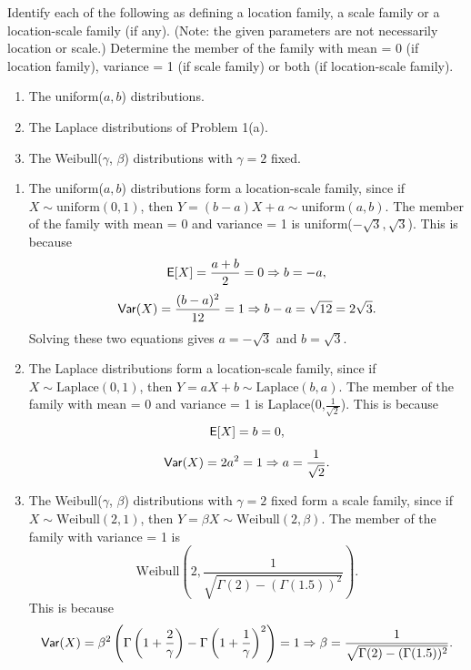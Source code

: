 \documentclass[12pt]{article}
\newcommand{\E}{{\sf E}}
\newcommand{\Var}{{\sf Var}}
\newenvironment{problem}[2][Problem]{\begin{trivlist}
\item[\hskip \labelsep {\bfseries #1}\hskip \labelsep {\bfseries #2.}]}
{\end{trivlist}}
\begin{document}
\begin{problem}{4}
  Identify each of the following as defining a location family, 
  a scale family or a location-scale family (if any). 
  (Note: the given parameters are not necessarily location or scale.) 
  Determine the member of the family with mean = 0 (if location family), 
  variance = 1 (if scale family) or both (if location-scale family).
  \begin{enumerate}
    \item The uniform($a, b$) distributions.
    \item The Laplace distributions of Problem 1(a).
    \item The Weibull($\gamma$, $\beta$) distributions with $\gamma = 2$
    fixed.
  \end{enumerate}
  
  \begin{enumerate}
    \item The uniform($a, b$) distributions form a location-scale family,
    since if $X \sim \text{uniform}(0,1)$, then $Y = (b-a)X + a \sim
    \text{uniform}(a,b)$. The member of the family with mean = 0 and
    variance = 1 is uniform($-\sqrt{3}, \sqrt{3}$).
    This is because
    \[
      \E[X] = \frac{a + b}{2} = 0 \Rightarrow b = -a,
    \]
    \[
      \Var(X) = \frac{(b - a)^2}{12} = 1 \Rightarrow b - a = \sqrt{12} = 2\sqrt{3}.
    \]
    Solving these two equations gives $a = -\sqrt{3}$ and $b = \sqrt{3}$.
    \item The Laplace distributions form a location-scale family, since
    if $X \sim \text{Laplace}(0,1)$, then $Y = aX + b \sim
    \text{Laplace}(b,a)$. The member of the family with mean = 0 and
    variance = 1 is Laplace(0,$\frac{1}{\sqrt{2}}$).
    This is because
    \[
      \E[X] = b = 0,
    \]
    \[
      \Var(X) = 2a^2 = 1 \Rightarrow a = \frac{1}{\sqrt{2}}.
    \]
    \item The Weibull($\gamma$, $\beta$) distributions with $\gamma = 2$
    fixed form a scale family, since if $X \sim \text{Weibull}(2,1)$, then
    $Y = \beta X \sim \text{Weibull}(2,\beta)$. The member of the family with
    variance = 1 is 
    \[
      \text{Weibull}\left(2, 
      \frac{1}{\sqrt{\Gamma(2) - (\Gamma(1.5))^2}}\right).
    \]
    This is because
    \[
      \Var(X) = \beta^2 \left( \Gamma\left(1 + \frac{2}{\gamma}\right) - 
      \Gamma\left(1 + \frac{1}{\gamma}\right)^2 \right) = 1 \Rightarrow 
      \beta = \frac{1}{\sqrt{\Gamma(2) - (\Gamma(1.5))^2}}.
    \]
  \end{enumerate}
\end{problem}
\end{document}
